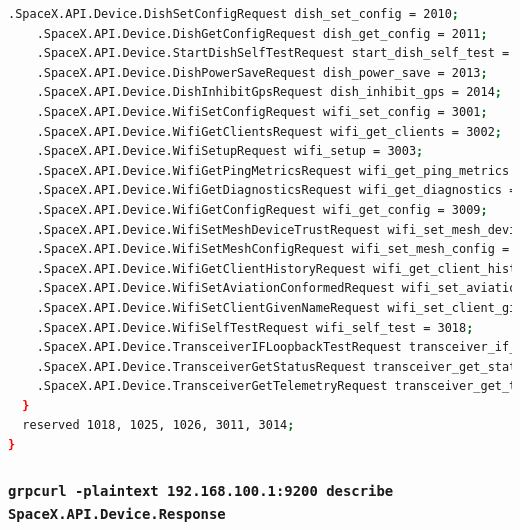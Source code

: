 \documentclass[IN,11pt,twoside,openright,idp,english]{tumthesis}
\begin{document}
\begin{lstlisting}[language=bash,basicstyle=\tiny]
    .SpaceX.API.Device.DishSetConfigRequest dish_set_config = 2010;
    .SpaceX.API.Device.DishGetConfigRequest dish_get_config = 2011;
    .SpaceX.API.Device.StartDishSelfTestRequest start_dish_self_test = 2012;
    .SpaceX.API.Device.DishPowerSaveRequest dish_power_save = 2013;
    .SpaceX.API.Device.DishInhibitGpsRequest dish_inhibit_gps = 2014;
    .SpaceX.API.Device.WifiSetConfigRequest wifi_set_config = 3001;
    .SpaceX.API.Device.WifiGetClientsRequest wifi_get_clients = 3002;
    .SpaceX.API.Device.WifiSetupRequest wifi_setup = 3003;
    .SpaceX.API.Device.WifiGetPingMetricsRequest wifi_get_ping_metrics = 3007;
    .SpaceX.API.Device.WifiGetDiagnosticsRequest wifi_get_diagnostics = 3008;
    .SpaceX.API.Device.WifiGetConfigRequest wifi_get_config = 3009;
    .SpaceX.API.Device.WifiSetMeshDeviceTrustRequest wifi_set_mesh_device_trust = 3012;
    .SpaceX.API.Device.WifiSetMeshConfigRequest wifi_set_mesh_config = 3013 [deprecated = true];
    .SpaceX.API.Device.WifiGetClientHistoryRequest wifi_get_client_history = 3015;
    .SpaceX.API.Device.WifiSetAviationConformedRequest wifi_set_aviation_conformed = 3016;
    .SpaceX.API.Device.WifiSetClientGivenNameRequest wifi_set_client_given_name = 3017;
    .SpaceX.API.Device.WifiSelfTestRequest wifi_self_test = 3018;
    .SpaceX.API.Device.TransceiverIFLoopbackTestRequest transceiver_if_loopback_test = 4001;
    .SpaceX.API.Device.TransceiverGetStatusRequest transceiver_get_status = 4003;
    .SpaceX.API.Device.TransceiverGetTelemetryRequest transceiver_get_telemetry = 4004;
  }
  reserved 1018, 1025, 1026, 3011, 3014;
}
\end{lstlisting}

\subsubsection{\texttt{grpcurl -plaintext 192.168.100.1:9200 describe SpaceX.API.Device.Response}}
\end{document}
